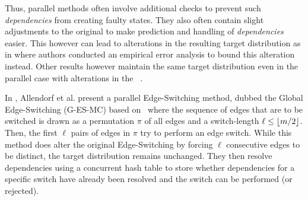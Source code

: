 Thus, parallel methods often involve additional checks to prevent such \emph{dependencies} from creating faulty states.
They also often contain slight adjustments to the original \markov to make prediction and handling of \emph{dependencies} easier.
This however can lead to alterations in the resulting target distribution as in \cite{DBLP:conf/icpp/BhuiyanCKM14} where authors conducted an empirical error analysis to bound this alteration instead.
Other results however maintain the same target distribution even in the parallel case with alterations in the \markov~\cite{DBLP:journals/jpdc/AllendorfMPT23,DBLP:conf/esa/CarstensH0PTW18}.

In \cite{DBLP:journals/jpdc/AllendorfMPT23}, Allendorf et al. present a parallel Edge-Switching method, dubbed the Global Edge-Switching \markov (G-ES-MC) based on~\cite{UnifyingFramework} where the sequence of edges that are to be switched is drawn as a permutation $\pi$ of all edges and a switch-length $\ell \leq \left\lfloor m / 2\right\rfloor$.
Then, the first $\ell$ pairs of edges in $\pi$ try to perform an edge switch.
While this method does alter the original Edge-Switching \markov by forcing $\ell$ consecutive edges to be distinct, the target distribution remains unchanged.
They then resolve dependencies using a concurrent hash table to store whether dependencies for a specific switch have already been resolved and the switch can be performed (or rejected).


